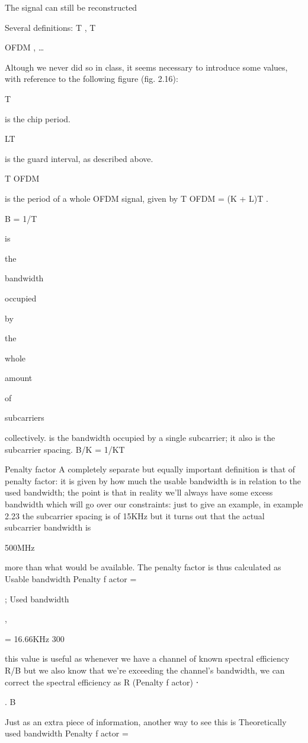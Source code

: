 {{{The signal can still be reconstructed

​Several definitions: T , T

OFDM , …

Altough we never did so in class, it seems necessary to introduce some values, with reference to the following figure (fig. 2.16):

T

is the chip period.

LT

is the guard interval, as described above.

T OFDM

is the period of a whole OFDM signal, given by T OFDM = (K + L)T .

B = 1/T

is

the

bandwidth

occupied

by

the

whole

amount

of

subcarriers

collectively.
is the bandwidth occupied by a single subcarrier; it also is the subcarrier spacing.
B/K = 1/KT

Penalty factor A completely separate but equally important definition is that of penalty factor: it is given by how much the usable bandwidth is in relation to the used bandwidth; the point is that in reality we'll always have some excess bandwidth which will go over our constraints: just to give an example, in example 2.23 the subcarrier spacing is of 15KHz but it turns out that the actual subcarrier bandwidth is

500MHz

more than what would be available. The penalty factor is thus calculated as Usable bandwidth Penalty f actor =

;
Used bandwidth

,

= 16.66KHz 300

this value is useful as whenever we have a channel of known spectral efficiency R/B but we also know that we're exceeding the channel's bandwidth, we can correct the spectral efficiency as R
(Penalty f actor) ⋅

.
B

Just as an extra piece of information, another way to see this is Theoretically used bandwidth Penalty f actor =

}}}
